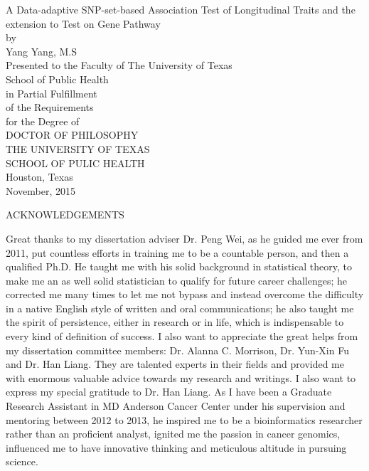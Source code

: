 \documentclass[12pt]{article}
\begin{document}
\newpage
\thispagestyle{empty}
\doublespacing
\begin{center}
{\normalsize A Data-adaptive SNP-set-based Association Test of Longitudinal Traits and the extension to Test on Gene Pathway}\\[3.2cm]

by\\[0.5cm]

Yang Yang, M.S\\[3.2cm]

Presented to the Faculty of The University of Texas\\
School of Public Health\\
in Partial Fulfillment\\
of the Requirements\\
for the Degree of\\[1.5cm]
DOCTOR OF PHILOSOPHY\\[1.5cm]
\singlespacing
THE UNIVERSITY OF TEXAS\\
SCHOOL OF PULIC HEALTH\\
Houston, Texas\\
November, 2015
\end{center}


\newpage
\thispagestyle{empty}
\doublespacing
\begin{center}
ACKNOWLEDGEMENTS
\end{center}
Great thanks to my dissertation adviser Dr. Peng Wei, as he guided me ever from 2011, put countless efforts in training me to be a countable person, and then a qualified Ph.D. He taught me with his solid background in statistical theory, to make me an as well solid statistician to qualify for future career challenges; he corrected me many times to let me not bypass and instead overcome the difficulty in a native English style of written and oral communications; he also taught me the spirit of persistence, either in research or in life, which is indispensable to every kind of definition of success. I also want to appreciate the great helps from my dissertation committee members: Dr. Alanna C. Morrison, Dr. Yun-Xin Fu and Dr. Han Liang. They are talented experts in their fields and provided me with enormous valuable advice towards my research and writings. I also want to express my special gratitude to Dr. Han Liang. As I have been a Graduate Research Assistant in MD Anderson Cancer Center under his supervision and mentoring between 2012 to 2013, he inspired me to be a bioinformatics researcher rather than an proficient analyst, ignited me the passion in cancer genomics, influenced me to have innovative thinking and meticulous altitude in pursuing science.
\end{document}
